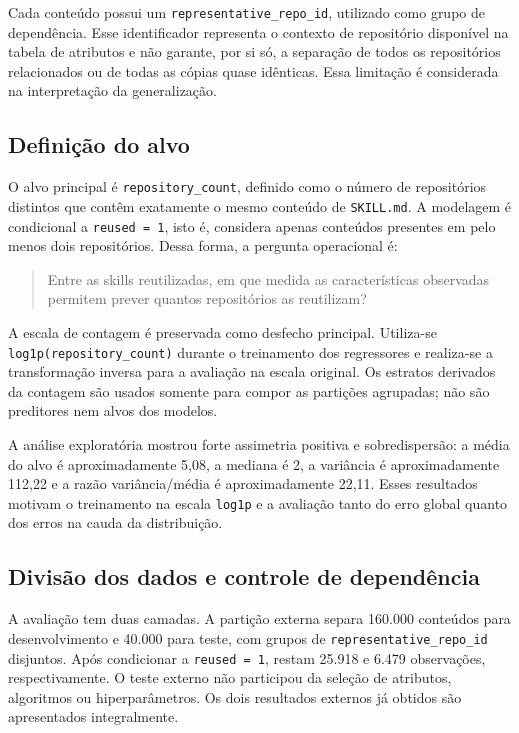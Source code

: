 Cada conteúdo possui um \texttt{representative\_repo\_id}, utilizado
como grupo de dependência. Esse identificador representa o contexto de
repositório disponível na tabela de atributos e não garante, por si só,
a separação de todos os repositórios relacionados ou de todas as cópias
quase idênticas. Essa limitação é considerada na interpretação da
generalização.

\subsection{Definição do alvo}\label{definiuxe7uxe3o-do-alvo}

O alvo principal é \texttt{repository\_count}, definido como o número de
repositórios distintos que contêm exatamente o mesmo conteúdo de
\texttt{SKILL.md}. A modelagem é condicional a \texttt{reused\ =\ 1},
isto é, considera apenas conteúdos presentes em pelo menos dois
repositórios. Dessa forma, a pergunta operacional é:

\begin{quote}
Entre as skills reutilizadas, em que medida as características
observadas permitem prever quantos repositórios as reutilizam?
\end{quote}

A escala de contagem é preservada como desfecho principal. Utiliza-se
\texttt{log1p(repository\_count)} durante o treinamento dos regressores
e realiza-se a transformação inversa para a avaliação na escala
original. Os estratos derivados da contagem são usados somente para
compor as partições agrupadas; não são preditores nem alvos dos modelos.

A análise exploratória mostrou forte assimetria positiva e
sobredispersão: a média do alvo é aproximadamente 5,08, a mediana é 2, a
variância é aproximadamente 112,22 e a razão variância/média é
aproximadamente 22,11. Esses resultados motivam o treinamento na escala
\texttt{log1p} e a avaliação tanto do erro global quanto dos erros na
cauda da distribuição.

\subsection{Divisão dos dados e controle de
dependência}\label{divisuxe3o-dos-dados-e-controle-de-dependuxeancia}

A avaliação tem duas camadas. A partição externa separa 160.000
conteúdos para desenvolvimento e 40.000 para teste, com grupos de
\texttt{representative\_repo\_id} disjuntos. Após condicionar a
\texttt{reused\ =\ 1}, restam 25.918 e 6.479 observações,
respectivamente. O teste externo não participou da seleção de atributos,
algoritmos ou hiperparâmetros. Os dois resultados externos já obtidos
são apresentados integralmente.

